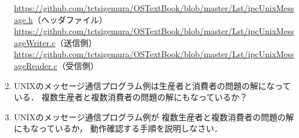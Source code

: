 \begin{enumerate}
  \url{https://github.com/tctsigemura/OSTextBook/blob/master/Lst/ipcUnixMessage.h}（ヘッダファイル）\\
  \url{https://github.com/tctsigemura/OSTextBook/blob/master/Lst/ipcUnixMessageWriter.c}（送信側）\\
  \url{https://github.com/tctsigemura/OSTextBook/blob/master/Lst/ipcUnixMessageReader.c}（受信側）
\item UNIXのメッセージ通信プログラム例は生産者と消費者の問題の解になっている．
  複数生産者と複数消費者の問題の解にもなっているか？
\item UNIXのメッセージ通信プログラム例が
  複数生産者と複数消費者の問題の解にもなっているか，
  動作確認する手順を説明しなさい．
\end{enumerate}
